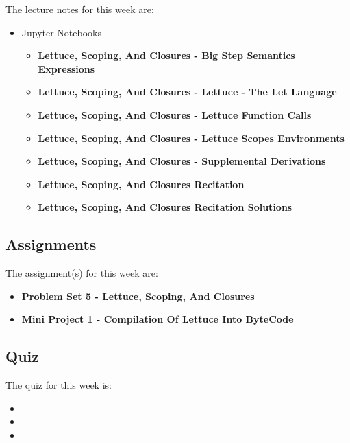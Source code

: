 \noindent The lecture notes for this week are:

\begin{itemize}
    \item Jupyter Notebooks
    \begin{itemize}
        \item \textbf{Lettuce, Scoping, And Closures - Big Step Semantics Expressions}
        \item \textbf{Lettuce, Scoping, And Closures - Lettuce - The Let Language}
        \item \textbf{Lettuce, Scoping, And Closures - Lettuce Function Calls}
        \item \textbf{Lettuce, Scoping, And Closures - Lettuce Scopes Environments}
        \item \textbf{Lettuce, Scoping, And Closures - Supplemental Derivations}
        \item \textbf{Lettuce, Scoping, And Closures Recitation}
        \item \textbf{Lettuce, Scoping, And Closures Recitation Solutions}
    \end{itemize}
\end{itemize}

\subsection{Assignments}

The assignment(s) for this week are:

\begin{itemize}
    \item \textbf{Problem Set 5 - Lettuce, Scoping, And Closures}
    \item \textbf{Mini Project 1 - Compilation Of Lettuce Into ByteCode}
\end{itemize}

\subsection{Quiz}

The quiz for this week is:

\begin{itemize}
    \item {}
    \item {}
    \item {}
\end{itemize}

